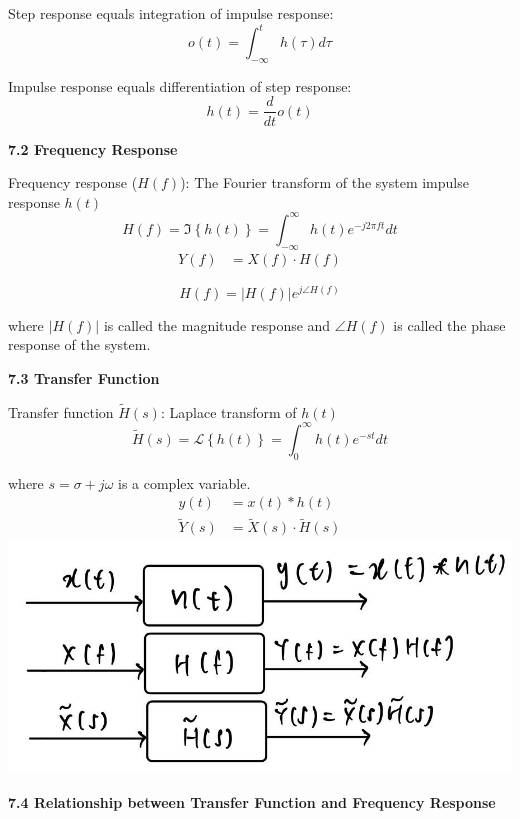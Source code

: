 \documentclass[landscape,a4paper]{extarticle}
\newenvironment{Figure}
  {\noindent\minipage{\linewidth}}
  {\endminipage\par\medskip}
\newcommand{\lap}[1]{\mathcal{L}\left\{#1\right\}}
\newcommand{\fourier}[1]{\Im\left\{#1\right\}}
\begin{document}
\begin{multicols*}{5}
    Step response equals integration of impulse response:
    \[
        o(t) = \int_{-\infty}^{t}h(\tau) d\tau
    \]

    Impulse response equals differentiation of step response:
    \[
        h(t) = \frac{d}{dt} o(t)
    \]

    \textbf{7.2 Frequency Response}

    Frequency response ($H(f)$): The Fourier transform of the system impulse response $h(t)$
    \[
        H(f) = \fourier{h(t)} = \int_{-\infty}^{\infty} h(t) e^{-j2\pi ft} dt \tag{7.6}
    \]
    \begin{align*}
        Y(f) &= X(f) \cdot H(f) \tag{7.7}
    \end{align*}


    \[
        H(f) = |H(f)| e^{j \angle H(f)} \tag{7.8}
    \]

    where $|H(f)|$ is called the magnitude response and $\angle H(f)$ is called the phase response of the system.

    \textbf{7.3 Transfer Function}

    Transfer function $\tilde{H}(s)$: Laplace transform of $h(t)$
    \[
        \tilde{H}(s) = \lap{h(t)} = \int_{0}^{\infty}h(t) e^{-st} dt \tag{7.9}
    \]

    where $s = \sigma + j \omega$ is a complex variable.
    \begin{align*}
        y(t) &= x(t) * h(t)\\
        \tilde{Y}(s) &= \tilde{X}(s) \cdot \tilde{H}(s) \tag{7.10}
    \end{align*}
    \begin{Figure}
        \centering
        \includegraphics[width=0.7\linewidth]{LTI_ht_hf_hs.jpg}        
    \end{Figure}

    \textbf{7.4 Relationship between Transfer Function and Frequency Response}


\end{multicols*}
\end{document}
